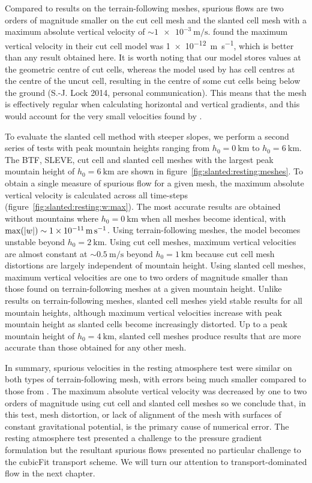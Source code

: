 Compared to results on the terrain-following meshes, spurious flows are two orders of magnitude smaller on the cut cell mesh and the slanted cell mesh with a maximum absolute vertical velocity of $\sim \SI{1e-3}{\meter\per\second}$.
\citet{good2014} found the maximum vertical velocity in their cut cell model was \SI{1e-12}{\meter\per\second}, which is better than any result obtained here.  It is worth noting that our model stores values at the geometric centre of cut cells, whereas the model used by \citet{good2014} has cell centres at the centre of the uncut cell, resulting in the centre of some cut cells being below the ground (S.-J. Lock 2014, personal communication).
This means that the mesh is effectively regular when calculating horizontal and vertical gradients, and this would account for the very small velocities found by \citet{good2014}.

To evaluate the slanted cell method with steeper slopes, we perform a second series of tests with peak mountain heights ranging from $h_0 = \SI{0}{\kilo\meter}$ to $h_0 = \SI{6}{\kilo\meter}$.
The BTF, SLEVE, cut cell and slanted cell meshes with the largest peak mountain height of $h_0 = \SI{6}{\kilo\meter}$ are shown in figure~\ref{fig:slanted:resting:meshes}.
To obtain a single measure of spurious flow for a given mesh, the maximum absolute vertical velocity is calculated across all time-steps (figure~\ref{fig:slanted:resting:w:max}).
The most accurate results are obtained without mountains where $h_0 = \SI{0}{\kilo\meter}$ when all meshes become identical, with $\max(\left\lvert w \right\rvert) \sim \SI{1e-11}{\meter\per\second}$.
Using terrain-following meshes, the model becomes unstable beyond $h_0 = \SI{2}{\kilo\meter}$.
Using cut cell meshes, maximum vertical velocities are almost constant at $\sim \SI{0.5}{\meter\per\second}$ beyond $h_0 = \SI{1}{\kilo\meter}$ because cut cell mesh distortions are largely independent of mountain height.
Using slanted cell meshes, maximum vertical velocities are one to two orders of magnitude smaller than those found on terrain-following meshes at a given mountain height.  Unlike results on terrain-following meshes, slanted cell meshes yield stable results for all mountain heights, although maximum vertical velocities increase with peak mountain height as slanted cells become increasingly distorted.  Up to a peak mountain height of $h_0 = \SI{4}{\kilo\meter}$, slanted cell meshes produce results that are more accurate than those obtained for any other mesh.

In summary, spurious velocities in the resting atmosphere test were similar on both types of terrain-following mesh, with errors being much smaller compared to those from \citet{klemp2011}.
The maximum absolute vertical velocity was decreased by one to two orders of magnitude using cut cell and slanted cell meshes so we conclude that, in this test, mesh distortion, or lack of alignment of the mesh with surfaces of constant gravitational potential, is the primary cause of numerical error.
The resting atmosphere test presented a challenge to the pressure gradient formulation but the resultant spurious flows presented no particular challenge to the cubicFit transport scheme.  We will turn our attention to transport-dominated flow in the next chapter.

